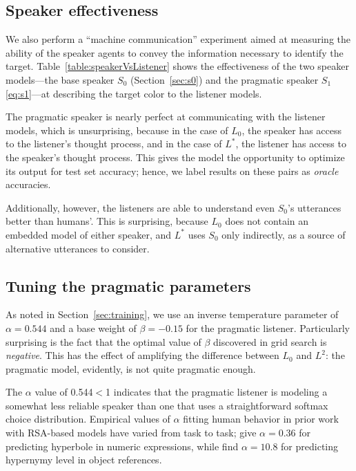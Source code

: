 \documentclass[11pt,letterpaper]{article}
\newcommand{\Listener}{L}
\newcommand{\Speaker}{S}
\renewcommand{\|}{\mid}
\newcommand{\secref}[1]{Section~\ref{#1}}
\newcommand{\Tabref}[1]{Table~\ref{#1}}
\begin{document}
\subsection{Speaker effectiveness} \label{sec:speaker_eff}

We also perform a ``machine communication'' experiment aimed at measuring the
ability of the speaker agents to convey the information necessary to identify
the target. \Tabref{table:speakerVsListener} shows the effectiveness of the
two speaker models---the base speaker $\Speaker_0$ (\secref{sec:s0}) and the
pragmatic speaker $\Speaker_1$ \eqref{eq:s1}---at describing the
target color to the listener models.

The pragmatic speaker is nearly perfect at communicating
with the listener models, which is unsurprising, because in the case of
$\Listener_0$, the speaker has access to the listener's thought process, and in
the case of $\Listener^*$, the listener has access to the speaker's thought process.
This gives the model the opportunity to optimize its output for test set
accuracy; hence, we label results on these pairs as \textit{oracle} accuracies.

Additionally, however, the listeners are able to understand even $\Speaker_0$'s
utterances better than humans'. This is surprising, because $\Listener_0$ does not
contain an embedded model of either speaker, and $\Listener^*$ uses $\Speaker_0$
only indirectly, as a source of alternative utterances to consider.

\subsection{Tuning the pragmatic parameters} \label{sec:alpha_beta}

As noted in \secref{sec:training}, we use an inverse temperature parameter of
$\alpha = 0.544$ and a base weight of $\beta = -0.15$ for the pragmatic
listener. Particularly surprising is the fact that the optimal value of $\beta$
discovered in grid search is \emph{negative}. This has the effect of amplifying
the difference between $\Listener_0$ and $\Listener^2$: the pragmatic model,
evidently, is not quite pragmatic enough.

The $\alpha$ value of 0.544${}<{}$1 indicates that the pragmatic listener is
modeling a somewhat less reliable speaker than one that uses a straightforward
softmax choice distribution. Empirical values of $\alpha$ fitting human behavior
in prior work with RSA-based models have varied from task to task;
 give $\alpha = 0.36$ for predicting
hyperbole in numeric expressions, while  find $\alpha = 10.8$ for
predicting hypernymy level in object references.
\end{document}
